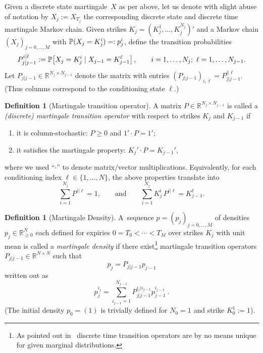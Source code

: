 \documentclass[twoside]{article}
\DeclareRobustCommand{\R}{\mathbb{R}}
\theoremstyle{plain}
\theoremstyle{definition}
\newtheorem{definition}[theorem]{Definition}
\theoremstyle{remark}
\begin{document}
Given a discrete state martingale~$X$ as per above, let us denote with slight abuse
of notation by $X_j:=X_{T_j}$
the corresponding discrete state and discrete time martingale Markov chain.
Given strikes $K_j=(K^1_j,\ldots,K^{N_j}_j)'$ and a Markov chain $(X_j)_{j=0,\ldots,M}$ with
$\P(X_j=K^i_j)=:p_j^i$, define the transition probabilities
\begin{equation}\label{eq:transX}
P_{j|j-1}^{i|\ell}:=\P\!\left[X_j=K^i_j \mid X_{j-1}=K^\ell_{j-1}\right], \qquad i=1,\ldots,N_j;\ \ell=1,\ldots,N_{j-1}.
\end{equation}
Let $P_{j|j-1}\in\R^{N_j\times N_{j-1}}$ denote the matrix with entries $(P_{j|j-1})_{i,\ell}=P_{j|j-1}^{i|\ell}$.
(Thus columns correspond to the conditioning state $\ell$.)
\begin{definition}[Martingale transition operator]\label{def:transiop}
A matrix $P\in\R^{N_j\times N_{j-1}}$ is called a \emph{(discrete) martingale transition operator}
with respect to strikes $K_j$ and $K_{j-1}$ if
\begin{enumerate}
    \item it is column-stochastic: $P\ge 0$ and $1' \cdot P=1'$;
    \item it satisfies the martingale property: $K_j'\cdot P=K_{j-1}'$,
\end{enumerate}
where we used ``$\cdot$'' to denote
matrix/vector multiplications. Equivalently, for each conditioning index $\ell\in\{1,\ldots,N\}$, the above properties translate into 
\[
    \sum_{i=1}^{N_j} P^{i|\ell}=1,
    \qquad\text{and}\qquad
    \sum_{i=1}^{N_j} K^{i}_j\,P^{i|\ell}=K^{\ell}_{j-1}.
\]
\end{definition}
\begin{definition}[Martingale Density]\label{def:martdens}
    A~sequence $p=(p_j)_{j=0,\ldots,M}$ of densities $p_j\in \R^{N}_{\geq 0}$ each defined for expiries $0=T_0<\cdots<T_M$ over strikes $K_j$ with unit mean is called a \emph{martingale density}
    if there exist\footnote{
         As pointed out in~\cite{buehler2006expensive} discrete time transition operators
    are by no means unique for given marginal distributions.    
    } martingale transition operators $P_{j|j-1}\in\R^{N\times N}$  such that
    $$
        p_j = P_{j|j-1} p_{j-1} 
    $$
    written out as
    $$
        p_j^{i_j} = \sum_{i_{j-1}=1}^{N_{j-1}} P_{j|j-1}^{i_j|i_{j-1}} p_{j-1}^{i_{j-1}} \ .
    $$     
    (The initial density $p_0=(1)$ is trivially defined for $N_0=1$ and strike $K_0^1:=1$).
\end{definition}
\end{document}
